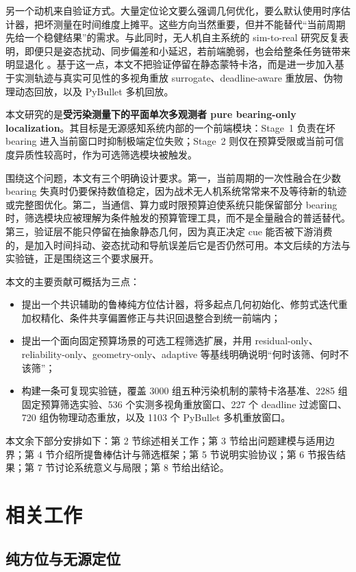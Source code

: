 \documentclass[drones,article,submit,moreauthors]{Definitions/mdpi}
\begin{document}
另一个动机来自验证方式。大量定位论文要么强调几何优化，要么默认使用时序估计器，把坏测量在时间维度上摊平。这些方向当然重要，但并不能替代“当前周期先给一个稳健结果”的需求。与此同时，无人机自主系统的 sim-to-real 研究反复表明，即便只是姿态扰动、同步偏差和小延迟，若前端脆弱，也会给整条任务链带来明显退化 \cite{panerati2021learning,perezsegui2023bridging}。基于这一点，本文不把验证停留在静态蒙特卡洛，而是进一步加入基于实测轨迹与真实可见性的多视角重放 surrogate、deadline-aware 重放层、伪物理动态回放，以及 PyBullet 多机回放。

本文研究的是\textbf{受污染测量下的平面单次多观测者 pure bearing-only localization}。其目标是无源感知系统内部的一个前端模块：Stage~1 负责在坏 bearing 进入当前窗口时抑制极端定位失败；Stage~2 则仅在预算受限或当前可信度异质性较高时，作为可选筛选模块被触发。

围绕这个问题，本文有三个明确设计要求。第一，当前周期的一次性融合在少数 bearing 失真时仍要保持数值稳定，因为战术无人机系统常常来不及等待新的轨迹或完整图优化。第二，当通信、算力或时限预算迫使系统只能保留部分 bearing 时，筛选模块应被理解为条件触发的预算管理工具，而不是全量融合的普适替代。第三，验证层不能只停留在抽象静态几何，因为真正决定 cue 能否被下游消费的，是加入时间抖动、姿态扰动和导航误差后它是否仍然可用。本文后续的方法与实验链，正是围绕这三个要求展开。

本文的主要贡献可概括为三点：
\begin{itemize}
\item 提出一个共识辅助的鲁棒纯方位估计器，将多起点几何初始化、修剪式迭代重加权精化、条件共享偏置修正与共识回退整合到统一前端内；
\item 提出一个面向固定预算场景的可选工程筛选扩展，并用 residual-only、reliability-only、geometry-only、adaptive 等基线明确说明“何时该筛、何时不该筛”；
\item 构建一条可复现实验链，覆盖 3000 组五种污染机制的蒙特卡洛基准、2285 组固定预算筛选实验、536 个实测多视角重放窗口、227 个 deadline 过滤窗口、720 组伪物理动态重放，以及 1103 个 PyBullet 多机重放窗口。
\end{itemize}

本文余下部分安排如下：第 2 节综述相关工作；第 3 节给出问题建模与适用边界；第 4 节介绍所提鲁棒估计与筛选框架；第 5 节说明实验协议；第 6 节报告结果；第 7 节讨论系统意义与局限；第 8 节给出结论。

\section{相关工作}

\subsection{纯方位与无源定位}
\end{document}
